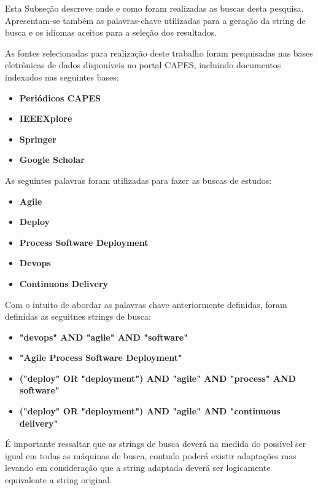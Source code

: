 \documentclass[12pt]{article}
\begin{document}
Esta  Subseção  descreve  onde  e  como  foram  realizadas
as  buscas  desta  pesquisa. Apresentam-se também as palavras-chave utilizadas para a geração da string  de busca e os idiomas aceitos para a seleção dos resultados.

As fontes selecionadas para realização deste trabalho foram pesquisadas nas bases eletrônicas de dados disponíveis no portal CAPES, incluindo documentos indexados nas seguintes bases:

 \begin{itemize}
   \item  \textbf{Periódicos CAPES}
   \item  \textbf{IEEEXplore}
   \item  \textbf{Springer}
   \item  \textbf{Google Scholar}
 \end{itemize}

As seguintes palavras foram utilizadas para fazer as buscas de estudos:

 \begin{itemize}
   \item  \textbf{Agile}
   \item  \textbf{Deploy}
   \item  \textbf{Process Software Deployment}
   \item  \textbf{Devops}
   \item  \textbf{Continuous Delivery}
 \end{itemize}

Com o intuito de abordar as palavras chave anteriormente definidas, foram definidas as seguitnes strings de busca:

 \begin{itemize}
  \item  \textbf{ "devops" AND  "agile" AND "software"}
  \item  \textbf{"Agile Process Software Deployment"}
  \item  \textbf{("deploy" OR "deployment") AND  "agile" AND "process" AND software" }
   \item  \textbf{("deploy" OR "deployment") AND  "agile" AND "continuous delivery"}

 \end{itemize}

É importante ressaltar que as strings de busca deverá na medida do possível ser igual em todas as máquinas de busca, contudo poderá existir adaptações mas levando em consideração que a string adaptada deverá ser logicamente equivalente a string original.
\end{document}
